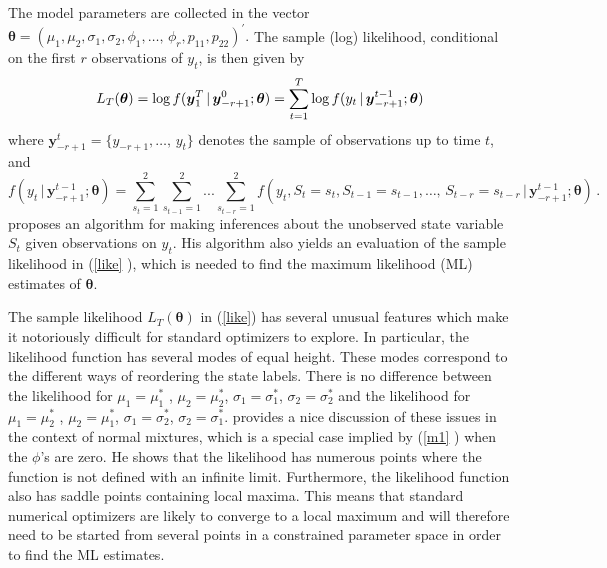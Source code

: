 \documentclass[11pt]{article}
\begin{document}
The model parameters are collected in the vector $\boldsymbol{\theta }=(\mu
_{1},\mu _{2},\sigma _{1},\sigma _{2},\phi _{1},\ldots ,\,\phi
_{r},p_{11},p_{22})^{\prime }.$ The sample (log) likelihood, conditional on
the first $r$ observations of $y_{t}$, is then given by 
\begin{equation}
L_{T}(\boldsymbol{\theta })=\log f(\boldsymbol{y}_{1}^{T}\,|\,\boldsymbol{y}%
_{-r+1}^{0};\boldsymbol{\theta })=\sum_{t=1}^{T}\log f(y_{t}\,|\,\boldsymbol{%
y}_{-r+1}^{t-1};\boldsymbol{\theta })  \label{like}
\end{equation}%
where $\boldsymbol{y}_{-r+1}^{t}=\{y_{-r+1},\ldots ,\,y_{t}\}$ denotes the
sample of observations up to time $t$, and 
\begin{equation*}
f(y_{t}\,|\,\boldsymbol{y}_{-r+1}^{t-1};\boldsymbol{\theta }%
)=\sum_{s_{t}=1}^{2}\sum_{s_{t-1}=1}^{2}...%
\sum_{s_{t-r}=1}^{2}f(y_{t},S_{t}=s_{t},S_{t-1}=s_{t-1},\ldots
,\,S_{t-r}=s_{t-r}\,|\,\boldsymbol{y}_{-r+1}^{t-1};\boldsymbol{\theta })\,.
\end{equation*}%
\citet{Hamilton:1989} proposes an algorithm for making inferences about the
unobserved state variable $S_{t}$ given observations on $y_{t}.$ His
algorithm also yields an evaluation of the sample likelihood in (\ref{like}%
), which is needed to find the maximum likelihood (ML) estimates of $%
\boldsymbol{\theta }$.

The sample likelihood $L_{T}(\boldsymbol{\theta })$ in (\ref{like}) has
several unusual features which make it notoriously difficult for standard
optimizers to explore. In particular, the likelihood function has several
modes of equal height. These modes correspond to the different ways of
reordering the state labels. There is no difference between the likelihood
for $\mu _{1}=\mu _{1}^{\ast }$ , $\mu _{2}=\mu _{2}^{\ast }$, $\sigma
_{1}=\sigma _{1}^{\ast }$, $\sigma _{2}=\sigma _{2}^{\ast }$ and the
likelihood for $\mu _{1}=\mu _{2}^{\ast }$ , $\mu _{2}=\mu _{1}^{\ast }$, $%
\sigma _{1}=\sigma _{2}^{\ast }$, $\sigma _{2}=\sigma _{1}^{\ast }$. %
\citet[][Ch. 1]{Rossi:2014} provides a nice discussion of these issues in
the context of normal mixtures, which is a special case implied by (\ref{m1}%
) when the $\phi $'s are zero. He shows that the likelihood has numerous
points where the function is not defined with an infinite limit.
Furthermore, the likelihood function also has saddle points containing local
maxima. This means that standard numerical optimizers are likely to converge
to a local maximum and will therefore need to be started from several points
in a constrained parameter space in order to find the ML estimates.
\end{document}
